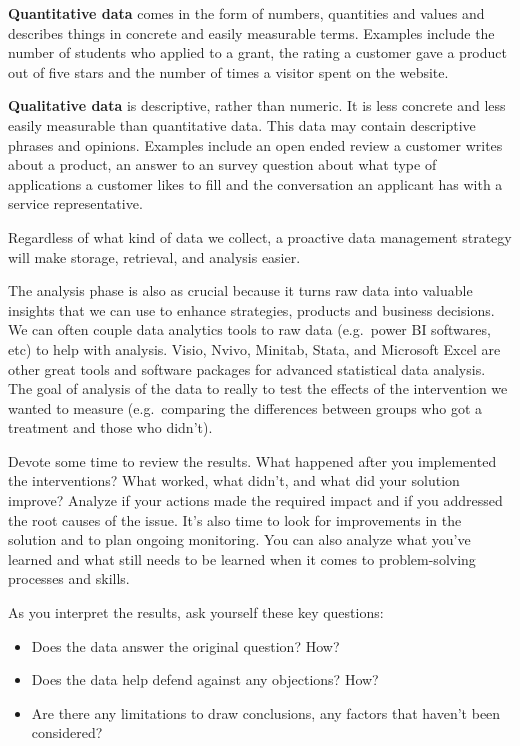 \documentclass[openany]{book}
\providecommand{\tightlist}{%
  \setlength{\itemsep}{0pt}\setlength{\parskip}{0pt}}
\begin{document}
\textbf{Quantitative data} comes in the form of numbers, quantities and values and describes things in concrete and easily measurable terms. Examples include the number of students who applied to a grant, the rating a customer gave a product out of five stars and the number of times a visitor spent on the website.

\textbf{Qualitative data} is descriptive, rather than numeric. It is less concrete and less easily measurable than quantitative data. This data may contain descriptive phrases and opinions. Examples include an open ended review a customer writes about a product, an answer to an survey question about what type of applications a customer likes to fill and the conversation an applicant has with a service representative.

Regardless of what kind of data we collect, a proactive data management strategy will make storage, retrieval, and analysis easier.

The analysis phase is also as crucial because it turns raw data into valuable insights that we can use to enhance strategies, products and business decisions. We can often couple data analytics tools to raw data (e.g.~power BI softwares, etc) to help with analysis. Visio, Nvivo, Minitab, Stata, and Microsoft Excel are other great tools and software packages for advanced statistical data analysis. The goal of analysis of the data to really to test the effects of the intervention we wanted to measure (e.g.~comparing the differences between groups who got a treatment and those who didn't).

Devote some time to review the results. What happened after you implemented the interventions? What worked, what didn't, and what did your solution improve? Analyze if your actions made the required impact and if you addressed the root causes of the issue. It's also time to look for improvements in the solution and to plan ongoing monitoring. You can also analyze what you've learned and what still needs to be learned when it comes to problem-solving processes and skills.

As you interpret the results, ask yourself these key questions:

\begin{itemize}
\tightlist
\item
  Does the data answer the original question? How?
\item
  Does the data help defend against any objections? How?
\item
  Are there any limitations to draw conclusions, any factors that haven't been considered?
\end{itemize}
\end{document}
